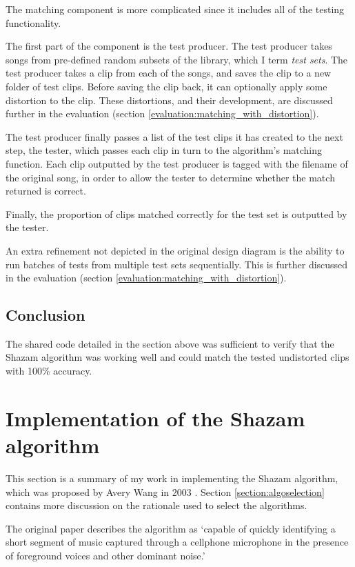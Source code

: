 \documentclass[12pt,a4paper,twoside,openright]{report}
\begin{document}
The matching component is more complicated since it includes all of the testing functionality.

The first part of the component is the test producer. The test producer takes songs from pre-defined random subsets of the library, which I term \textit{test sets}. The test producer takes a clip from each of the songs, and saves the clip to a new folder of test clips. Before saving the clip back, it can optionally apply some distortion to the clip. These distortions, and their development, are discussed further in the evaluation (section \ref{evaluation:matching_with_distortion}).

The test producer finally passes a list of the test clips it has created to the next step, the tester, which passes each clip in turn to the algorithm's matching function. Each clip outputted by the test producer is tagged with the filename of the original song, in order to allow the tester to determine whether the match returned is correct.

Finally, the proportion of clips matched correctly for the test set is outputted by the tester.

An extra refinement not depicted in the original design diagram is the ability to run batches of tests from multiple test sets sequentially. This is further discussed in the evaluation (section \ref{evaluation:matching_with_distortion}). 


\subsection{Conclusion}

The shared code detailed in the section above was sufficient to verify that the Shazam algorithm was working well and could match the tested undistorted clips with 100\% accuracy.



\section{Implementation of the Shazam algorithm}
\label{section:shazam}

This section is a summary of my work in implementing the Shazam algorithm, which was proposed by Avery Wang in 2003 \cite{Wang03}. Section \ref{section:algoselection} contains more discussion on the rationale used to select the algorithms.

The original paper describes the algorithm as `capable of quickly identifying a short segment of music captured through a cellphone microphone in the presence of foreground voices and other dominant noise.' %
\end{document}
